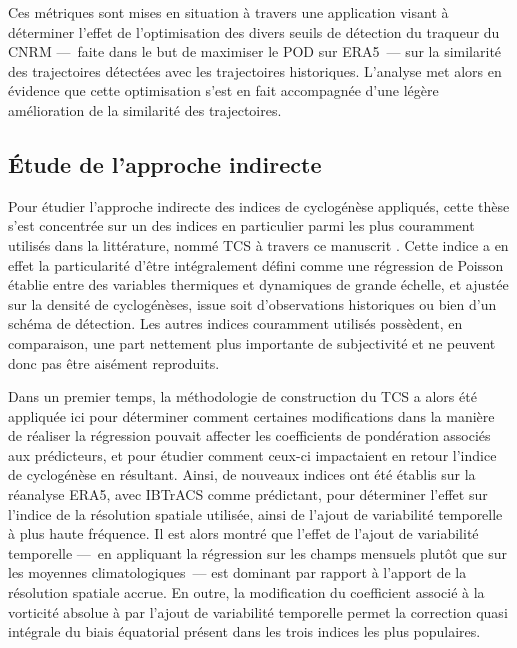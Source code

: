 \documentclass[../main.tex]{subfiles}
\begin{document}
Ces métriques sont mises en situation à travers une application visant à déterminer l'effet de l'optimisation des divers seuils de détection du traqueur du CNRM
---~faite dans le but de maximiser le POD sur ERA5~--- sur la similarité des trajectoires détectées avec les trajectoires historiques. L'analyse met alors en
évidence que cette optimisation s'est en fait accompagnée d'une légère amélioration de la similarité des trajectoires.

\subsection*{Étude de l'approche indirecte}

Pour étudier l'approche indirecte des indices de cyclogénèse appliqués, cette thèse s'est concentrée sur un des indices en particulier parmi les plus couramment
utilisés dans la littérature, nommé TCS à travers ce manuscrit \parencite{tippett_poisson_2011}. Cette indice a en effet la particularité d'être intégralement
défini comme une régression de Poisson établie entre des variables thermiques et dynamiques de grande échelle, et ajustée sur la densité de cyclogénèses, issue
soit d'observations historiques ou bien d'un schéma de détection. Les autres indices couramment utilisés possèdent, en comparaison, une part nettement plus
importante de subjectivité et ne peuvent donc pas être aisément reproduits.

Dans un premier temps, la méthodologie de construction du TCS a alors été appliquée ici pour déterminer comment certaines modifications dans la manière de
réaliser la régression pouvait affecter les coefficients de pondération associés aux prédicteurs, et pour étudier comment ceux-ci impactaient en retour l'indice
de cyclogénèse en résultant. Ainsi, de nouveaux indices ont été établis sur la réanalyse ERA5, avec IBTrACS comme prédictant, pour déterminer l'effet sur
l'indice de la résolution spatiale utilisée, ainsi de l'ajout de variabilité temporelle à plus haute fréquence. Il est alors montré que l'effet de l'ajout de
variabilité temporelle ---~en appliquant la régression sur les champs mensuels plutôt que sur les moyennes climatologiques~--- est dominant par rapport à
l'apport de la résolution spatiale accrue. En outre, la modification du coefficient associé à la vorticité absolue à  par l'ajout de variabilité
temporelle permet la correction quasi intégrale du biais équatorial présent dans les trois indices les plus populaires.
\end{document}
